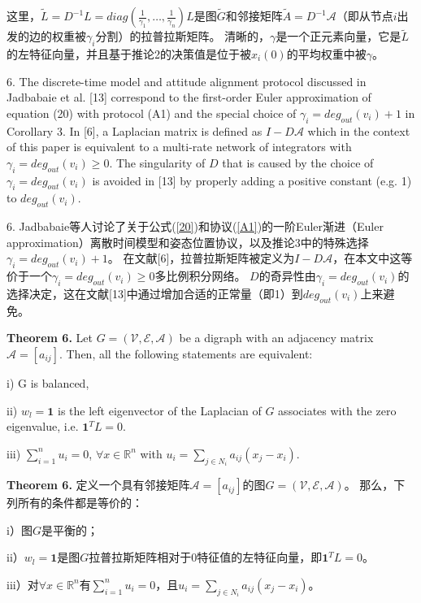 \documentclass{article}
\begin{document}
\noindent 这里，$\tilde{L} = D^{-1}L = diag(\frac{1}{\gamma_1},\dots,\frac{1}{\gamma_n})L$是图$\tilde{G}$和邻接矩阵$\tilde{A}=D^{-1}\mathcal{A}$（即从节点$i$出发的边的权重被$\gamma_i$分割）的拉普拉斯矩阵。
清晰的，$\gamma$是一个正元素向量，它是$\tilde{L}$的左特征向量，并且基于推论2的决策值是位于被$x_i(0)$的平均权重中被$\gamma$。

{\color[gray]{0.5}
 6. The discrete-time model and attitude alignment protocol discussed in Jadbabaie et al. [13] correspond to the ﬁrst-order Euler approximation of equation (20) with protocol (A1) and the special choice of $\gamma_i=deg_{out}(v_i)+1$ in Corollary 3. 
In [6], a Laplacian matrix is deﬁned as $I-D\mathcal{A}$ which in the context of this paper is equivalent to a multi-rate network of integrators with $\gamma_i=deg_{out}(v_i)\ge 0$. 
The singularity of $D$ that is caused by the choice of $\gamma_i=deg_{out}(v_i)$ is avoided in [13] by properly adding a positive constant (e.g. 1) to $deg_{out}(v_i)$.
}

 6. Jadbabaie等人讨论了关于公式(\ref{20})和协议(\ref{A1})的一阶Euler渐进（Euler approximation）离散时间模型和姿态位置协议，以及推论3中的特殊选择$\gamma_i=deg_{out}(v_i)+1$。
在文献[6]，拉普拉斯矩阵被定义为$I-D\mathcal{A}$，在本文中这等价于一个$\gamma_i=deg_{out}(v_i)\ge 0$多比例积分网络。
$D$的奇异性由$\gamma_i=deg_{out}(v_i)$的选择决定，这在文献[13]中通过增加合适的正常量（即1）到$deg_{out}(v_i)$上来避免。

{\color[gray]{0.5}
\noindent \textbf{Theorem 6.} Let $G=(\mathcal{V}, \mathcal{E}, \mathcal{A})$ be a digraph with an adjacency matrix $\mathcal{A}=[a_{ij}]$. 
Then, all the following statements are equivalent:

i) G is balanced, 

ii) $w_l = \mathbf{1}$ is the left eigenvector of the Laplacian of $G$ associates with the zero eigenvalue, i.e. $\mathbf{1}^TL = 0$.

iii) $\sum_{i=1}^n u_i = 0$, $\forall x \in \mathbb{R}^n$ with $u_i = \sum_{j\in N_i}a_{ij}(x_j - x_i)$.
}

\noindent \textbf{Theorem 6.} 定义一个具有邻接矩阵$\mathcal{A}=[a_{ij}]$的图$G=(\mathcal{V}, \mathcal{E}, \mathcal{A})$。
那么，下列所有的条件都是等价的：

i）图$G$是平衡的；

ii）$w_l = \mathbf{1}$是图$G$拉普拉斯矩阵相对于0特征值的左特征向量，即$\mathbf{1}^TL = 0$。

iii）对$\forall x \in \mathbb{R}^n$有$\sum_{i=1}^n u_i = 0$，且$u_i = \sum_{j\in N_i}a_{ij}(x_j - x_i)$。
\end{document}
